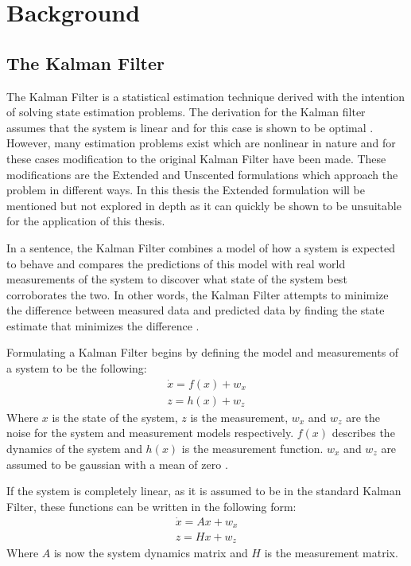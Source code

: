 \chapter{Background}

\section{The Kalman Filter}
The Kalman Filter is a statistical estimation technique derived with the intention of solving state estimation problems. \cite{ukf_merwe} The derivation for the Kalman filter assumes that the system is linear and for this case is shown to be optimal \cite{kf_kalman}. However, many estimation problems exist which are nonlinear in nature and for these cases modification to the original Kalman Filter have been made. These modifications are the Extended and Unscented formulations which approach the problem in different ways. In this thesis the Extended formulation will be mentioned but not explored in depth as it can quickly be shown to be unsuitable for the application of this thesis.

In a sentence, the Kalman Filter combines a model of how a system is expected to behave and compares the predictions of this model with real world measurements of the system to discover what state of the system best corroborates the two. In other words, the Kalman Filter attempts to minimize the difference between measured data and predicted data by finding the state estimate that minimizes the difference \cite{kf_derivation}.

Formulating a Kalman Filter begins by defining the model and measurements of a system to be the following:
\begin{align}\label{system_functions}
\dot{x} = f(x) + w_x \\
z = h(x) + w_z
\end{align}
Where $x$ is the state of the system, $z$ is the measurement, $w_x$ and $w_z$ are the noise for the system and measurement models respectively. $f(x)$ describes the dynamics of the system and $h(x)$ is the measurement function. $w_x$ and $w_z$ are assumed to be gaussian with a mean of zero \cite{kf_derivation}. 

If the system is completely linear, as it is assumed to be in the standard Kalman Filter, these functions can be written in the following form:
\begin{align}\label{linear_systems}
\dot{x} = Ax + w_x \\
z = Hx + w_z
\end{align}
Where $A$ is now the system dynamics matrix and $H$ is the measurement matrix.

